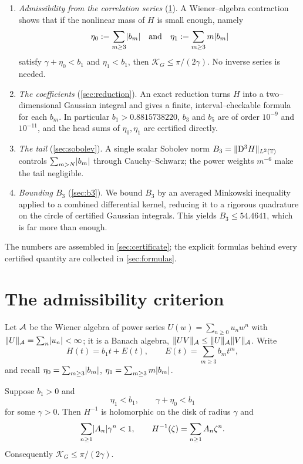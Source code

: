 \documentclass[12pt]{article}
\providecommand{\KG}{\mathcal{K}_G}
\newcommand{\Dop}{\mathrm{D}}              %
\newcommand{\gam}{\gamma}
\begin{document}
\begin{enumerate}[leftmargin=2.2em]
\item \emph{Admissibility from the correlation series} (\cref{sec:wiener}).
A Wiener--algebra contraction shows that if the nonlinear mass of $H$ is small
enough, namely
\[
   \eta_0:=\sum_{m\ge3}\lvert b_m\rvert\quad\text{and}\quad
   \eta_1:=\sum_{m\ge3}m\lvert b_m\rvert
\]
satisfy $\gam+\eta_0<b_1$ and $\eta_1<b_1$, then $\KG\le\pi/(2\gam)$.  No inverse
series is needed.
\item \emph{The coefficients} (\cref{sec:reduction}).  An exact reduction turns
$H$ into a two--dimensional Gaussian integral and gives a finite, interval--checkable
formula for each $b_m$.  In particular $b_1>0.8815738220$, $b_3$ and $b_5$ are
of order $10^{-9}$ and $10^{-11}$, and the head sums of $\eta_0,\eta_1$ are
certified directly.
\item \emph{The tail} (\cref{sec:sobolev}).  A single scalar Sobolev norm
$B_3=\norm{\Dop^3H}_{L^2(\T)}$ controls $\sum_{m>N}\lvert b_m\rvert$ through
Cauchy--Schwarz; the power weights $m^{-6}$ make the tail negligible.
\item \emph{Bounding $B_3$} (\cref{sec:b3}).  We bound $B_3$ by an averaged
Minkowski inequality applied to a combined differential kernel, reducing it to a
rigorous quadrature on the circle of certified Gaussian integrals.  This yields
$B_3\le 54.4641$, which is far more than enough.
\end{enumerate}

\noindent The numbers are assembled in \cref{sec:certificate}; the explicit
formulas behind every certified quantity are collected in
\cref{sec:formulas}.

\section{The admissibility criterion}\label{sec:wiener}

Let $\mathcal{A}$ be the Wiener algebra of power series $U(w)=\sum_{n\ge0}u_nw^n$ with
$\lVert U\rVert_{\mathcal{A}}=\sum_n\lvert u_n\rvert<\infty$; it is a Banach algebra,
$\lVert UV\rVert_{\mathcal{A}}\le\lVert U\rVert_{\mathcal{A}}\lVert V\rVert_{\mathcal{A}}$.  Write
\begin{equation}\label{eq:H-split}
   H(t)=b_1t+E(t),\qquad E(t)=\sum_{m\ge3}b_mt^m,
\end{equation}
and recall $\eta_0=\sum_{m\ge3}\lvert b_m\rvert$, $\eta_1=\sum_{m\ge3}m\lvert b_m\rvert$.

\begin{lemma}\label{lem:wiener}
Suppose $b_1>0$ and
\begin{equation}\label{eq:wiener-cond}
   \eta_1<b_1,\qquad \gam+\eta_0<b_1
\end{equation}
for some $\gam>0$.  Then $H^{-1}$ is holomorphic on the disk of radius $\gam$ and
\[
   \sum_{n\ge1}\abs{A_n}\gam^n<1,\qquad H^{-1}(\zeta)=\sum_{n\ge1}A_n\zeta^n .
\]
Consequently $\KG\le\pi/(2\gam)$.
\end{lemma}
\end{document}
